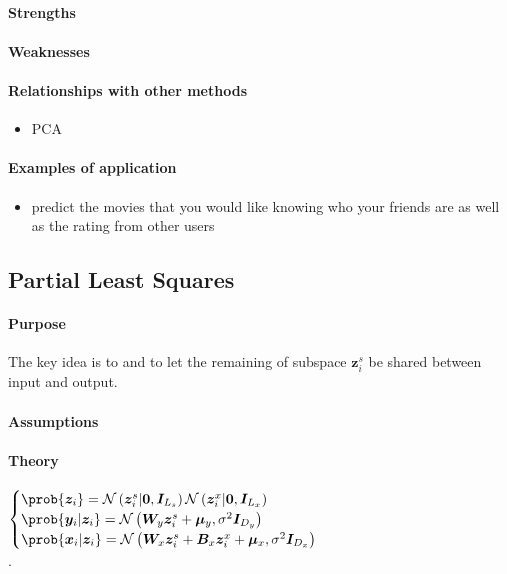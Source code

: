 \paragraph{Strengths}
\paragraph{Weaknesses}
\paragraph{Relationships with other methods}
\begin{itemize}
    \item PCA
\end{itemize}

\paragraph{Examples of application}
\begin{itemize}
    \item predict the movies that you would like knowing who your friends are as well 
        as the rating from other users
\end{itemize}


\subsection{Partial Least Squares}
\paragraph{Purpose}
The key idea is to  and to let the remaining of subspace $\bm{z}_{i}^{
s}$ be shared between input and output.
\paragraph{Assumptions}
\paragraph{Theory}
$\begin{cases}
    \prob{\bm{z}_{i}} = \mathcal{N}\left(\bm{z}^{s}_{i}|\bm{0},\bm{I}_{L_{s}}\right)
    \mathcal{N}\left(\bm{z}^{x}_{i}|\bm{0},\bm{I}_{L_{x}}\right)\\
    \prob{\bm{y}_{i}|\bm{z}_{i}} = \mathcal{N}\left(\bm{W}_{y}\bm{z}^{s}_{i} + 
    \bm{\mu}_{y},\sigma^{2}\bm{I}_{D_{y}}
    \right)\\
        \prob{\bm{x}_{i}|\bm{z}_{i}} = \mathcal{N}\left(\bm{W}_{x}\bm{z}^{s}_{i} + \bm{B}_{x}
        \bm{z}^{x}_{i} + \bm{\mu}_{x},\sigma^{2}\bm{I}_{D_{x}}\right)
\end{cases}$\\
.

